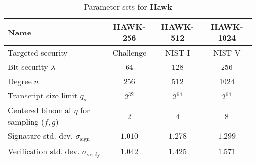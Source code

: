 \begin{table}[h]
    \centering
    \caption{Parameter sets for \textbf{Hawk}}
    \label{tab:hawk-parameters}
    \begin{tabular}{lccc}
        \toprule
        \textbf{Name} & \textbf{HAWK-256} & \textbf{HAWK-512} & \textbf{HAWK-1024} \\
        \midrule
        \multicolumn{1}{l}{Targeted security} & Challenge & NIST-I & NIST-V \\
        Bit security $\lambda$ & 64 & 128 & 256 \\
        \midrule
        Degree $n$ & 256 & 512 & 1024 \\ 
        Transcript size limit $q_s$ & $2^{32}$ & $2^{64}$ & $2^{64}$ \\ 
        Centered binomial $\eta$ for sampling ($f, g$) & 2 & 4 & 8 \\
        Signature std. dev. $\sigma_{\text{sign}}$ & $1.010$ & $1.278$ & $1.299$ \\
        Verification std. dev. $\sigma_{\text{verify}}$ & $1.042$ & $1.425$ & $1.571$ \\
        \bottomrule
    \end{tabular}
\end{table}

